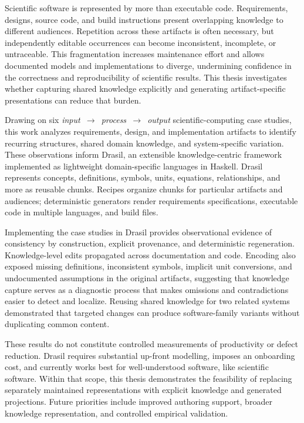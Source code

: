 
Scientific software is represented by more than executable code. Requirements,
designs, source code, and build instructions present overlapping knowledge to
different audiences. Repetition across these artifacts is often necessary, but
independently editable occurrences can become inconsistent, incomplete, or
untraceable. This fragmentation increases maintenance effort and allows
documented models and implementations to diverge, undermining confidence in the
correctness and reproducibility of scientific results. This thesis investigates
whether capturing shared knowledge explicitly and generating artifact-specific
presentations can reduce that burden.

Drawing on six \mbox{\emph{input~$\rightarrow$~process~$\rightarrow$~output}}
scientific-computing case studies, this work analyzes requirements, design, and
implementation artifacts to identify recurring structures, shared domain
knowledge, and system-specific variation. These observations inform Drasil, an
extensible knowledge-centric framework implemented as lightweight
domain-specific languages in Haskell. Drasil represents concepts, definitions,
symbols, units, equations, relationships, and more as reusable chunks. Recipes
organize chunks for particular artifacts and audiences; deterministic generators
render requirements specifications, executable code in multiple languages, and
build files.

Implementing the case studies in Drasil provides observational evidence of
consistency by construction, explicit provenance, and deterministic
regeneration. Knowledge-level edits propagated across documentation and code.
Encoding also exposed missing definitions, inconsistent symbols, implicit unit
conversions, and undocumented assumptions in the original artifacts, suggesting
that knowledge capture serves as a diagnostic process that makes omissions and
contradictions easier to detect and localize. Reusing shared knowledge for two
related systems demonstrated that targeted changes can produce software-family
variants without duplicating common content.

These results do not constitute controlled measurements of productivity or
defect reduction. Drasil requires substantial up-front modelling, imposes an
onboarding cost, and currently works best for well-understood software, like 
scientific
software. Within that scope, this thesis demonstrates the feasibility of
replacing separately maintained representations with explicit knowledge and
generated projections. Future priorities include improved authoring support,
broader knowledge representation, and controlled empirical validation.
